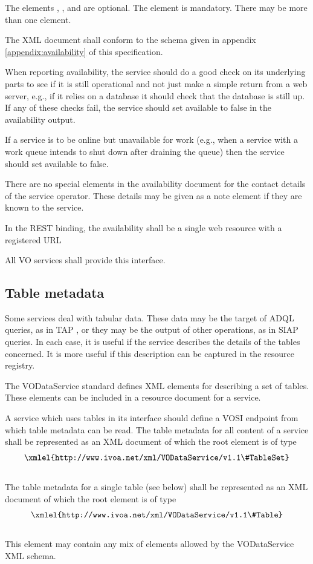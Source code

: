 \documentclass[11pt,letter]{ivoa}
\begin{document}
The elements , ,  and  are optional. The  element is mandatory. There may be more than one  element.

The XML document shall conform to the schema given in appendix \ref{appendix:availability} of this specification.

When reporting availability, the service should do a good check on its underlying parts to see if it is still operational and not just make a simple return from a web server, e.g., if it relies on a database it should check that the database is still up. If any of these checks fail, the service should set available to false in the availability output.

If a service is to be online but unavailable for work (e.g., when a service with a work queue intends to shut down after draining the queue) then the service should set available to false.

There are no special elements in the availability document for the contact details of the service operator. These details may be given as a note element if they are known to the service.

In the REST binding, the availability shall be a single web resource with a registered URL

All VO services shall provide this interface. 

\subsection{Table metadata}

 Some services deal with tabular data. These data may be the target of ADQL queries, as in TAP \citep{std:TAP}, or they may be the output of other operations, as in SIAP queries. In each case, it is useful if the service describes the details of the tables concerned. It is more useful if this description can be captured in the resource registry.

The VODataService standard \citep{std:VODS11} defines XML elements for describing a set of tables. These elements can be included in a resource document for a service.

A service which uses tables in its interface should define a VOSI endpoint from which table metadata can be read. The table metadata for all content of a service shall be represented as an XML document of which the root element is of type\\
$$\hbox{\xmlel{http://www.ivoa.net/xml/VODataService/v1.1\#TableSet}}$$\\
The table metadata for a single table (see below) shall be represented as an
XML document of which the root element is of type\\
$$\hbox{\xmlel{http://www.ivoa.net/xml/VODataService/v1.1\#Table}}$$\\
This element may contain any mix of elements allowed by the VODataService XML schema.
\end{document}
